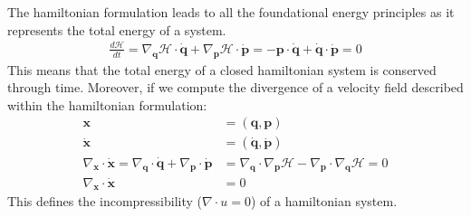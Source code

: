 \documentclass[draft]{agujournal2019}
\begin{document}
\begin{definition}
    The hamiltonian formulation leads to all the foundational energy principles as it represents the total energy of a system.
    \begin{align*}
        \frac{d\mathcal{H}}{dt} = \nabla_\mathbf{q} \mathcal{H} \cdot \dot{\mathbf{q}} + \nabla_\mathbf{p} \mathcal{H} \cdot \dot{\mathbf{p}} = - \mathbf{p} \cdot \dot{\mathbf{q}} + \dot{\mathbf{q}} \cdot \dot{\mathbf{p}} = 0
    \end{align*}
    This means that the total energy of a closed hamiltonian system is conserved through time.
    Moreover, if we compute the divergence of a velocity field described within the hamiltonian formulation:
\begin{align*}
    \mathbf{x} &= (\mathbf{q}, \mathbf{p}) \\
    \dot{\mathbf{x}} &= (\dot{\mathbf{q}}, \dot{\mathbf{p}}) \\
    \nabla_\mathbf{x} \cdot \dot{\mathbf{x}} = \nabla_\mathbf{q} \cdot \dot{\mathbf{q}} + \nabla_\mathbf{p} \cdot \dot{\mathbf{p}} &= \nabla_\mathbf{q} \cdot \nabla_\mathbf{p} \mathcal{H} - \nabla_\mathbf{p} \cdot \nabla_\mathbf{q} \mathcal{H} = 0 \\
    \nabla_\mathbf{x} \cdot \dot{\mathbf{x}} &= 0
\end{align*}
This defines the incompressibility ($\nabla \cdot u = 0$) of a hamiltonian system.

\end{definition}



%
%
%
%
%

\end{document}
